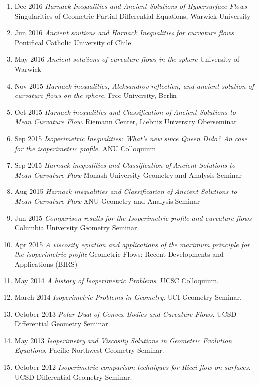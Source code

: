 \documentclass[12pt]{amsart}
\begin{document}
\begin{enumerate}[resume]
\item Dec 2016 \emph{Harnack Inequalities and Ancient Solutions of Hypersurface Flows} Singularities of Geometric Partial Differential Equations, Warwick University
\item Jun 2016 \emph{Ancient soutions and Harnack Inequalities for curvature flows} Pontifical Catholic University of Chile
\item May 2016 \emph{Ancient solutions of curvature flows in the sphere} University of Warwick
\item Nov 2015 \emph{Harnack inequalities, Aleksandrov reflection, and ancient solution of curvature flows on the sphere.}  Free University, Berlin
\item Oct 2015 \emph{Harnack inequalities and Classification of Ancient Solutions to Mean Curvature Flow.} Riemann Center, Liebniz University Oberseminar
\item Sep 2015 \emph{Isoperimetric Inequalities: What's new since Queen Dido? An case for the isoperimetric profile.} ANU Colloquium
\item Sep 2015 \emph{Harnack inequalities and Classification of Ancient Solutions to Mean Curvature Flow} Monash University Geometry and Analysis Seminar
\item Aug 2015 \emph{Harnack inequalities and Classification of Ancient Solutions to Mean Curvature Flow} ANU Geometry and Analysis Seminar
\item Jun 2015 \emph{Comparison results for the Isoperimetric profile and curvature flows} Columbia University Geometry Seminar
\item Apr 2015 \emph{A viscosity equation and applications of the maximum principle for the isoperimetric profile} Geometric Flows: Recent Developments and Applications (BIRS)
\item May 2014 \emph{A history of Isoperimetric Problems}. UCSC Colloquium.
\item March 2014 \emph{Isoperimetric Problems in Geometry}. UCI Geometry Seminar.
\item October 2013 \emph{Polar Dual of Convex Bodies and Curvature Flows}. UCSD Differential Geometry Seminar.
\item May 2013 \emph{Isoperimetry and Viscosity Solutions in Geometric Evolution Equations}. Pacific Northwest Geometry Seminar.
\item October 2012 \emph{Isoperimetric comparison techniques for Ricci flow on surfaces}. UCSD Differential Geometry Seminar.

\end{enumerate}
\end{document}
